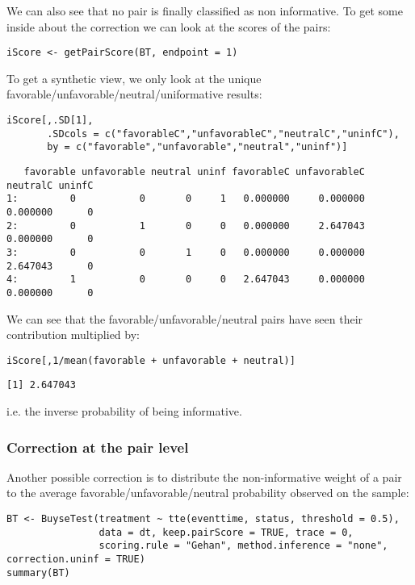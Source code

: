 \documentclass[12pt]{article}
\begin{document}
We can also see that no pair is finally classified as non
informative. To get some inside about the correction we can look at
the scores of the pairs:
\lstset{language=r,label= ,caption= ,captionpos=b,numbers=none}
\begin{lstlisting}
iScore <- getPairScore(BT, endpoint = 1)
\end{lstlisting}

To get a synthetic view, we only look at the unique
favorable/unfavorable/neutral/uniformative results:
\lstset{language=r,label= ,caption= ,captionpos=b,numbers=none}
\begin{lstlisting}
iScore[,.SD[1], 
	   .SDcols = c("favorableC","unfavorableC","neutralC","uninfC"),
	   by = c("favorable","unfavorable","neutral","uninf")]
\end{lstlisting}

\begin{verbatim}
   favorable unfavorable neutral uninf favorableC unfavorableC neutralC uninfC
1:         0           0       0     1   0.000000     0.000000 0.000000      0
2:         0           1       0     0   0.000000     2.647043 0.000000      0
3:         0           0       1     0   0.000000     0.000000 2.647043      0
4:         1           0       0     0   2.647043     0.000000 0.000000      0
\end{verbatim}

We can see that the favorable/unfavorable/neutral pairs have seen
their contribution multiplied by:
\lstset{language=r,label= ,caption= ,captionpos=b,numbers=none}
\begin{lstlisting}
iScore[,1/mean(favorable + unfavorable + neutral)]
\end{lstlisting}

\begin{verbatim}
[1] 2.647043
\end{verbatim}

i.e. the inverse probability of being informative. 

\subsubsection{Correction at the pair level}
\label{sec:orge9a3443}

Another possible correction is to distribute the non-informative
weight of a pair to the average favorable/unfavorable/neutral
probability observed on the sample:
\lstset{language=r,label= ,caption= ,captionpos=b,numbers=none}
\begin{lstlisting}
BT <- BuyseTest(treatment ~ tte(eventtime, status, threshold = 0.5),
				data = dt, keep.pairScore = TRUE, trace = 0,
				scoring.rule = "Gehan", method.inference = "none", correction.uninf = TRUE)
summary(BT)
\end{lstlisting}
\end{document}
